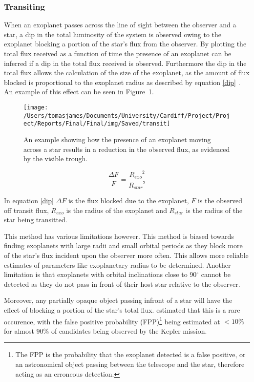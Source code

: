 \documentclass{report}
\begin{document}
\subsubsection{Transiting}
When an exoplanet passes across the line of sight between the observer and a star, a dip in the total luminosity of the system is observed owing to the exoplanet blocking a portion of the star's flux from the observer. By plotting the total flux received as a function of time the presence of an exoplanet can be inferred if a dip in the total flux received is observed. Furthermore the dip in the total flux allows the calculation of the size of the exoplanet, as the amount of flux blocked is proportional to the exoplanet radius as described by equation \ref{dip} \parencite{radius}. An example of this effect can be seen in Figure~\ref{Transit}.

\begin{figure}[H]
\centering
    \texttt{[image: /Users/tomasjames/Documents/University/Cardiff/Project/Project/Reports/Final/Final/img/Saved/transit]}
\caption[An example showing how the presence of an exoplanet moving across a star results in a reduction in the observed flux, as evidenced by the visible trough.]{An example showing how the presence of an exoplanet moving across a star results in a reduction in the observed flux, as evidenced by the visible trough. \parencite{transitimg}}\label{Transit}
\end{figure}

\begin{equation} \label{dip}
    \frac{\Delta F}{F} = \frac{{R_{exo}}^{2}}{{R_{star}}^{2}}
\end{equation}

In equation \ref{dip} $\Delta F$ is the flux blocked due to the exoplanet, $F$ is the observed off transit flux, $R_{exo}$ is the radius of the exoplanet and $R_{star}$ is the radius of the star being transitted.

This method has various limitations however. This method is biased towards finding exoplanets with large radii and small orbital periods as they block more of the star$’$s flux incident upon the observer more often. This allows more reliable estimates of parameters like exoplanetary radius to be determined. Another limitation is that exoplanets with orbital inclinations close to 90$^\circ$ cannot be detected as they do not pass in front of their host star relative to the observer.

Moreover, any partially opaque object passing infront of a star will have the effect of blocking a portion of the star's total flux. \textcite{false} estimated that this is a rare occurence, with the false positive probability (FPP)\footnote{The FPP is the probability that the exoplanet detected is a false positive, or an astronomical object passing between the telescope and the star, therefore acting as an erroneous detection.} being estimated at $<10\%$ for almost 90\% of candidates being observed by the Kepler mission.
\end{document}
